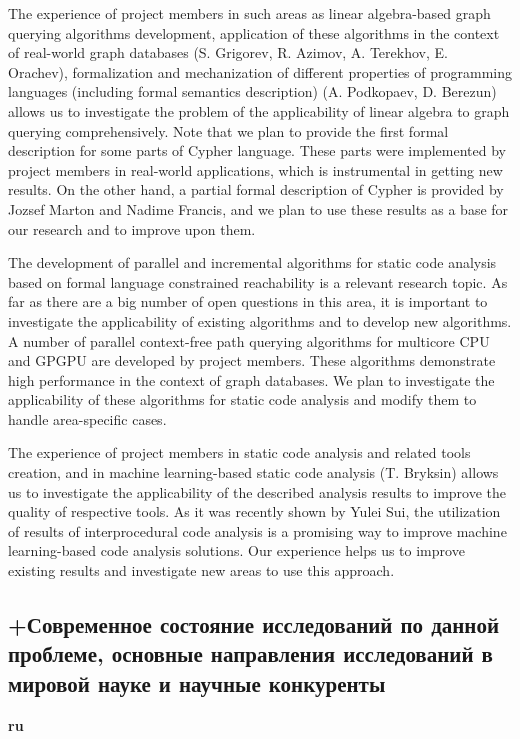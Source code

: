 \documentclass[12pt]{article}  %
\theoremstyle{remark}
\begin{document}
The experience of project members in such areas as linear algebra-based graph querying algorithms development, application of these algorithms in the context of real-world graph databases (S. Grigorev, R. Azimov, A. Terekhov, E. Orachev), formalization and mechanization of different properties of programming languages (including formal semantics description) (A. Podkopaev, D. Berezun) allows us to investigate the problem of the applicability of linear algebra to graph querying comprehensively. Note that we plan to provide the first formal description for some parts of Cypher language. These parts were implemented by project members in real-world applications, which is instrumental in getting new results. On the other hand, a partial formal description of Cypher is provided by Jozsef Marton and Nadime Francis, and we plan to use these results as a base for our research and to improve upon them.

The development of parallel and incremental algorithms for static code analysis based on formal language constrained reachability is a relevant research topic. As far as there are a big number of open questions in this area, it is important to investigate the applicability of existing algorithms and to develop new algorithms. A number of parallel context-free path querying algorithms for multicore CPU and GPGPU are developed by project members. These algorithms demonstrate high performance in the context of graph databases. We plan to investigate the applicability of these algorithms for static code analysis and modify them to handle area-specific cases.

The experience of project members in static code analysis and related tools creation, and in machine learning-based static code analysis (T. Bryksin) allows us to investigate the applicability of the described analysis results to improve the quality of respective tools. As it was recently shown by Yulei Sui, the utilization of results of interprocedural code analysis is a promising way to improve machine learning-based code analysis solutions. Our experience helps us to improve existing results and investigate new areas to use this approach.

\subsection{+Современное состояние исследований по данной проблеме, основные направления исследований в мировой науке и научные конкуренты}

\textbf{ru}\\
\end{document}
